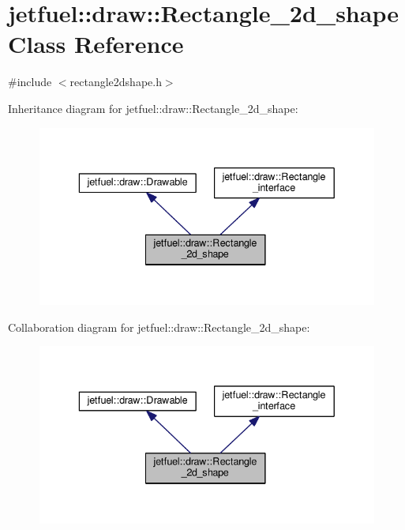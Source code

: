 \hypertarget{classjetfuel_1_1draw_1_1Rectangle__2d__shape}{}\section{jetfuel\+:\+:draw\+:\+:Rectangle\+\_\+2d\+\_\+shape Class Reference}
\label{classjetfuel_1_1draw_1_1Rectangle__2d__shape}


{\ttfamily \#include $<$rectangle2dshape.\+h$>$}



Inheritance diagram for jetfuel\+:\+:draw\+:\+:Rectangle\+\_\+2d\+\_\+shape\+:\nopagebreak
\begin{figure}[H]
\begin{center}
\leavevmode
\includegraphics[width=336pt]{classjetfuel_1_1draw_1_1Rectangle__2d__shape__inherit__graph}
\end{center}
\end{figure}


Collaboration diagram for jetfuel\+:\+:draw\+:\+:Rectangle\+\_\+2d\+\_\+shape\+:\nopagebreak
\begin{figure}[H]
\begin{center}
\leavevmode
\includegraphics[width=336pt]{classjetfuel_1_1draw_1_1Rectangle__2d__shape__coll__graph}
\end{center}
\end{figure}
